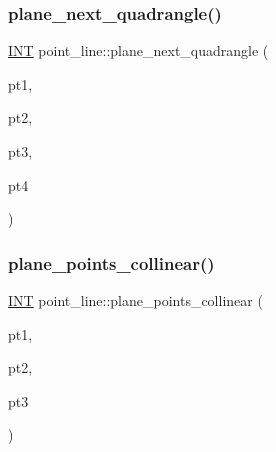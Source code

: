 \subsubsection{\texorpdfstring{plane\+\_\+next\+\_\+quadrangle()}{plane\_next\_quadrangle()}}
{\footnotesize\ttfamily \mbox{\hyperlink{galois_8h_a09fddde158a3a20bd2dcadb609de11dc}{I\+NT}} point\+\_\+line\+::plane\+\_\+next\+\_\+quadrangle (\begin{DoxyParamCaption}\item[{\mbox{\hyperlink{galois_8h_a09fddde158a3a20bd2dcadb609de11dc}{I\+NT}} \&}]{pt1,  }\item[{\mbox{\hyperlink{galois_8h_a09fddde158a3a20bd2dcadb609de11dc}{I\+NT}} \&}]{pt2,  }\item[{\mbox{\hyperlink{galois_8h_a09fddde158a3a20bd2dcadb609de11dc}{I\+NT}} \&}]{pt3,  }\item[{\mbox{\hyperlink{galois_8h_a09fddde158a3a20bd2dcadb609de11dc}{I\+NT}} \&}]{pt4 }\end{DoxyParamCaption})}

\mbox{\label{classpoint__line_a5cef2c3e46d7e904c2b80539af03f0a3}} 
\subsubsection{\texorpdfstring{plane\+\_\+points\+\_\+collinear()}{plane\_points\_collinear()}}
{\footnotesize\ttfamily \mbox{\hyperlink{galois_8h_a09fddde158a3a20bd2dcadb609de11dc}{I\+NT}} point\+\_\+line\+::plane\+\_\+points\+\_\+collinear (\begin{DoxyParamCaption}\item[{\mbox{\hyperlink{galois_8h_a09fddde158a3a20bd2dcadb609de11dc}{I\+NT}}}]{pt1,  }\item[{\mbox{\hyperlink{galois_8h_a09fddde158a3a20bd2dcadb609de11dc}{I\+NT}}}]{pt2,  }\item[{\mbox{\hyperlink{galois_8h_a09fddde158a3a20bd2dcadb609de11dc}{I\+NT}}}]{pt3 }\end{DoxyParamCaption})}

\mbox{\label{classpoint__line_a112db572dd7ed8ef94f5bcf82240c410}} 
